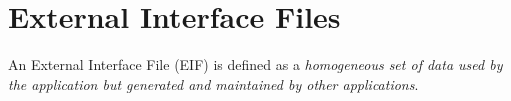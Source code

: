 \section{External Interface Files}
An External Interface File (EIF) is defined as a \emph{homogeneous set of data used by the application but generated and maintained by other applications}.
